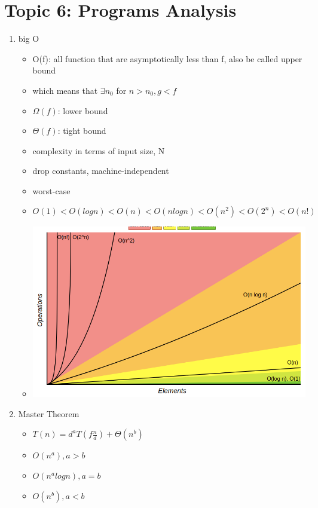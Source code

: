 \documentclass[11pt, a4paper]{article}
\begin{document}
\section*{Topic 6: Programs Analysis}
    \begin{enumerate}
        \item big O
            \begin{itemize}
                \item O(f): all function that are asymptotically less than f, also be called upper bound
                \item which means that $\exists n_0$ for $n > n_0, g < f$
                \item $\Omega(f)$: lower bound
                \item $\Theta(f)$: tight bound
                \item complexity in terms of input size, N
                \item drop constants, machine-independent
                \item worst-case
                \item $O(1) < O(logn) < O(n) < O(nlogn) < O(n^2) < O(2^n) < O(n!)$
                \item
                    \includegraphics[scale=0.5]{bigo}
            \end{itemize}
        \item Master Theorem
            \begin{itemize}
                \item $T(n) = d^a T(f\frac{n}{d}) + \Theta(n^b)$
                \item $O(n^a), a>b$
                \item $O(n^alogn), a=b$
                \item $O(n^b), a<b$
            \end{itemize}
    \end{enumerate}
\end{document}
